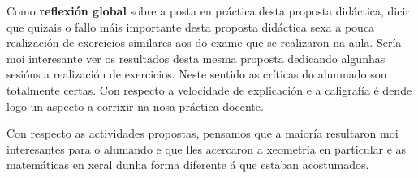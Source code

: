 Como \textbf{reflexión global} sobre a posta en práctica desta proposta didáctica, dicir que quizais o fallo máis importante desta proposta didáctica sexa a pouca realización de exercicios similares aos do exame que se realizaron na aula. Sería moi interesante ver os resultados desta mesma proposta dedicando algunhas sesións a realización de exercicios. Neste sentido as críticas do alumnado son totalmente certas. Con respecto a velocidade de explicación e a caligrafía é dende logo un aspecto a corrixir na nosa práctica docente.

Con respecto as actividades propostas, pensamos que a maioría resultaron moi interesantes para o alumando e que lles acercaron a xeometría en particular e as matemáticas en xeral dunha forma diferente á que estaban acostumados.
